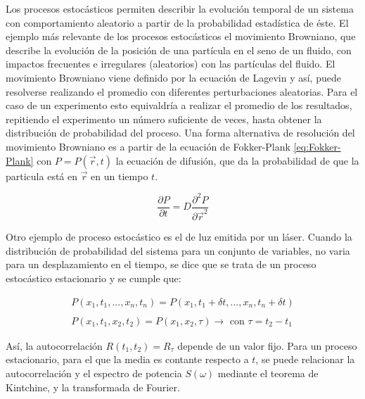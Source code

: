 
	

Los procesos estoc\'asticos permiten describir la evoluci\'on temporal de un sistema con comportamiento aleatorio a partir de la probabilidad estad\'istica de \'este. El ejemplo m\'as relevante de los procesos estoc\'asticos el movimiento Browniano, que describe la evoluci\'on de la posici\'on de una part\'icula en el seno de un fluido, con impactos frecuentes e irregulares (aleatorios) con las part\'iculas del fluido. El movimiento Browniano viene definido por la ecuaci\'on de Lagevin y as\'i, puede resolverse realizando el promedio con diferentes perturbaciones aleatorias. Para el caso de un experimento esto equivaldr\'ia a realizar el promedio de los resultados, repitiendo el experimento un n\'umero suficiente de veces, hasta obtener la distribuci\'on de probabilidad del proceso.  Una forma alternativa de resoluci\'on del movimiento Browniano es a partir de la ecuaci\'on de Fokker-Plank \ref{eq:Fokker-Plank} con $P = P(\vec{r}, t)$ la ecuaci\'on de difusi\'on, que da la probabilidad de que la particula est\'a en $\vec{r}$ en un tiempo $t$.

	\begin{equation}
		\frac{\partial P}{\partial t} = D \frac{\partial^2 P}{\partial \vec{r}^2}
		\label{eq:Fokker-Plank}
	\end{equation}

	Otro ejemplo de proceso estoc\'astico es el de luz emitida por un l\'aser. Cuando la distribuci\'on de probabilidad del sistema para un conjunto de variables, no varia para un desplazamiento en el tiempo, se dice que se trata de un proceso estoc\'astico estacionario y se cumple que:
	
	\begin{equation}
		\begin{matrix}
			P(x_1, t_1,..., x_n, t_n) = P(x_1, t_1+\delta t,..., x_n, t_n+\delta t) \\ \\
			P(x_1, t_1, x_2, t_2) = P(x_1, x_2, \tau) \rightarrow \textrm{      con    } \tau = t_2 - t_1
		\end{matrix}
	\end{equation}

As\'i, la autocorrelaci\'on $R(t_1, t_2) = R_\tau$ depende de un valor fijo. Para un proceso estacionario, para el que la media es contante respecto a $t$, se puede relacionar la autocorrelaci\'on y el espectro de potencia $S(\omega)$ mediante el teorema de Kintchine, y la transformada de Fourier.

